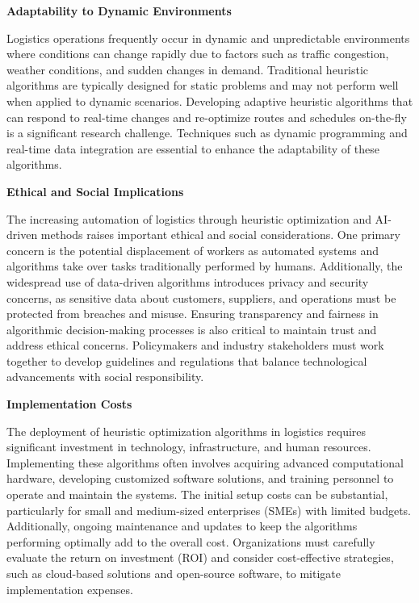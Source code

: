 \documentclass[
]{article}
\begin{document}
    \textbf{Adaptability to Dynamic Environments}

    Logistics operations frequently occur in dynamic and unpredictable environments where conditions can change rapidly due to factors such as traffic congestion, weather conditions, and sudden changes in demand. Traditional heuristic algorithms are typically designed for static problems and may not perform well when applied to dynamic scenarios. Developing adaptive heuristic algorithms that can respond to real-time changes and re-optimize routes and schedules on-the-fly is a significant research challenge. Techniques such as dynamic programming and real-time data integration are essential to enhance the adaptability of these algorithms.

    \textbf{Ethical and Social Implications}

    The increasing automation of logistics through heuristic optimization and AI-driven methods raises important ethical and social considerations. One primary concern is the potential displacement of workers as automated systems and algorithms take over tasks traditionally performed by humans. Additionally, the widespread use of data-driven algorithms introduces privacy and security concerns, as sensitive data about customers, suppliers, and operations must be protected from breaches and misuse. Ensuring transparency and fairness in algorithmic decision-making processes is also critical to maintain trust and address ethical concerns. Policymakers and industry stakeholders must work together to develop guidelines and regulations that balance technological advancements with social responsibility.

    \textbf{Implementation Costs}

    The deployment of heuristic optimization algorithms in logistics requires significant investment in technology, infrastructure, and human resources. Implementing these algorithms often involves acquiring advanced computational hardware, developing customized software solutions, and training personnel to operate and maintain the systems. The initial setup costs can be substantial, particularly for small and medium-sized enterprises (SMEs) with limited budgets. Additionally, ongoing maintenance and updates to keep the algorithms performing optimally add to the overall cost. Organizations must carefully evaluate the return on investment (ROI) and consider cost-effective strategies, such as cloud-based solutions and open-source software, to mitigate implementation expenses.
\end{document}
